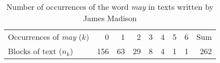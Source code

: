 \begin{table}[htb]
\centering
\caption{Number of occurrences of the word \emph{may} in texts written by James Madison\label{tab:fedtab}} 
\begin{tabular}{l|rrrrrrr|r}
   \hline
Occurrences of \emph{may} ($k$) & 0 & 1 & 2 & 3 & 4 & 5 & 6 & Sum \\ 
  Blocks of text ($n_k$)       & 156 &  63 &  29 &   8 &   4 &   1 &   1 & 262 \\ 
   \hline
\end{tabular}
\end{table}
